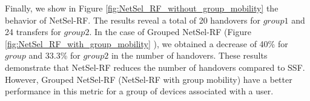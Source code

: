 Finally, we show in Figure \ref{fig:NetSel_RF_without_group_mobility} the behavior of NetSel-RF. The results reveal a total of 20 handovers for $group1$ and 24 transfers for $group2$. In the case of Grouped NetSel-RF (Figure \ref{fig:NetSel_RF_with_group_mobility} ), we obtained a decrease of 40\% for $group$ and 33.3\% for $group2$ in the number of handovers. These results demonstrate that NetSel-RF reduces the number of handovers compared to SSF. However, Grouped NetSel-RF (NetSel-RF with group mobility) have a better performance in this metric for a group of devices associated with a user.
